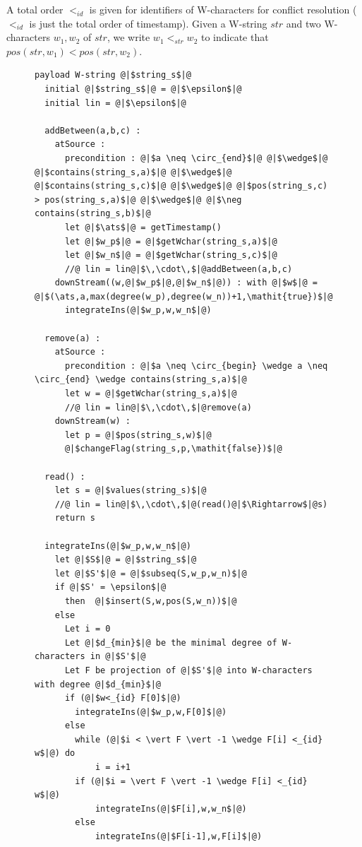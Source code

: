 
A total order $<_{id}$ is given for identifiers of W-characters for conflict resolution ($<_{id}$ is just the total order of timestamp). Given a W-string $str$ and two W-characters $w_1,w_2$ of $str$, we write $w_1 <_{str} w_2$ to indicate that $pos(str,w_1) < pos(str,w_2)$.


\begin{figure}[!h]
\begin{lstlisting}[frame=top,caption={Pseudo-code of Wooki algorithm},
captionpos=b,label={lst:wooki algorithm}]
  payload W-string @|$string_s$|@
  initial @|$string_s$|@ = @|$\epsilon$|@
  initial lin = @|$\epsilon$|@

  addBetween(a,b,c) :
    atSource :
      precondition : @|$a \neq \circ_{end}$|@ @|$\wedge$|@ @|$contains(string_s,a)$|@ @|$\wedge$|@ @|$contains(string_s,c)$|@ @|$\wedge$|@ @|$pos(string_s,c) > pos(string_s,a)$|@ @|$\wedge$|@ @|$\neg contains(string_s,b)$|@
      let @|$\ats$|@ = getTimestamp()
      let @|$w_p$|@ = @|$getWchar(string_s,a)$|@
      let @|$w_n$|@ = @|$getWchar(string_s,c)$|@
      //@ lin = lin@|$\,\cdot\,$|@addBetween(a,b,c)
    downStream((w,@|$w_p$|@,@|$w_n$|@)) : with @|$w$|@ = @|$(\ats,a,max(degree(w_p),degree(w_n))+1,\mathit{true})$|@
      integrateIns(@|$w_p,w,w_n$|@)

  remove(a) :
    atSource :
      precondition : @|$a \neq \circ_{begin} \wedge a \neq \circ_{end} \wedge contains(string_s,a)$|@
      let w = @|$getWchar(string_s,a)$|@
      //@ lin = lin@|$\,\cdot\,$|@remove(a)
    downStream(w) :
      let p = @|$pos(string_s,w)$|@
      @|$changeFlag(string_s,p,\mathit{false})$|@

  read() :
    let s = @|$values(string_s)$|@
    //@ lin = lin@|$\,\cdot\,$|@(read()@|$\Rightarrow$|@s)
    return s

  integrateIns(@|$w_p,w,w_n$|@)
    let @|$S$|@ = @|$string_s$|@
    let @|$S'$|@ = @|$subseq(S,w_p,w_n)$|@
    if @|$S' = \epsilon$|@
      then  @|$insert(S,w,pos(S,w_n))$|@
    else
      Let i = 0
      Let @|$d_{min}$|@ be the minimal degree of W-characters in @|$S'$|@
      Let F be projection of @|$S'$|@ into W-characters with degree @|$d_{min}$|@
      if (@|$w<_{id} F[0]$|@)
        integrateIns(@|$w_p,w,F[0]$|@)
      else
        while (@|$i < \vert F \vert -1 \wedge F[i] <_{id} w$|@) do
            i = i+1
        if (@|$i = \vert F \vert -1 \wedge F[i] <_{id} w$|@)
            integrateIns(@|$F[i],w,w_n$|@)
        else
            integrateIns(@|$F[i-1],w,F[i]$|@)
\end{lstlisting}
\end{figure}


